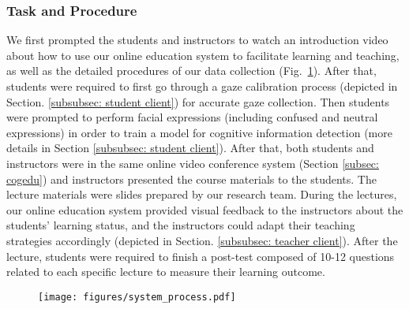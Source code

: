 \subsubsection{\textbf{Task and Procedure}}
We first prompted the students and instructors to watch an introduction video about how to use our online education system to facilitate learning and teaching, as well as the detailed procedures of our data collection (Fig.~\ref{system procedure}).
%
After that, students were required to first go through a gaze calibration process (depicted in Section. \ref{subsubsec: student client}) for accurate gaze collection.
%
Then students were prompted to perform facial expressions (including confused and neutral expressions) in order to train a model for cognitive information detection (more details in Section \ref{subsubsec: student client}). 
%
After that, both students and instructors were in the same online video conference system (Section \ref{subsec: cogedu}) and instructors presented the course materials to the students. The lecture materials were slides prepared by our research team. During the lectures, our online education system provided visual feedback to the instructors about the students' learning status, and the instructors could adapt their teaching strategies accordingly (depicted in Section. \ref{subsubsec: teacher client}).
%
After the lecture, students were required to finish a post-test composed of 10-12 questions related to each specific lecture to measure their learning outcome. 

\begin{figure}%
\centering
\texttt{[image: figures/system\_process.pdf]}
\caption{
}
\label{system procedure}
\end{figure}


